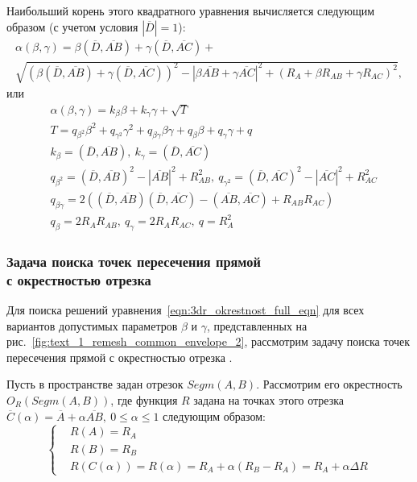 Наибольший корень этого квадратного уравнения вычисляется следующим образом (с учетом условия $|\overline{D}| = 1$):
\begin{multline}
	\alpha(\beta, \gamma) = \beta (\overline{D}, \overline{AB}) + \gamma (\overline{D}, \overline{AC}) + \\
	\sqrt{(\beta (\overline{D}, \overline{AB}) + \gamma (\overline{D}, \overline{AC}))^2 - |\beta \overline{AB} + \gamma \overline{AC}|^2 + (R_A + \beta R_{AB} + \gamma R_{AC})^2},
\end{multline}
или
\begin{equation}\label{eqn:3dr_okrestnost_full_eqn}
	\begin{aligned}
		& \alpha(\beta, \gamma) = k_{\beta} \beta + k_{\gamma} \gamma + \sqrt{T} \\
		& T = q_{\beta^2} \beta^2 + q_{\gamma^2} \gamma^2 + q_{\beta \gamma} \beta \gamma + q_{\beta} \beta + q_{\gamma} \gamma + q \\
		& k_{\beta} = (\overline{D}, \overline{AB}), \ k_{\gamma} = (\overline{D}, \overline{AC}) \\
		& q_{\beta^2} = (\overline{D}, \overline{AB})^2 - |\overline{AB}|^2 + R_{AB}^2, \ q_{\gamma^2} = (\overline{D}, \overline{AC})^2 - |\overline{AC}|^2 + R_{AC}^2 \\
		& q_{\beta \gamma} = 2 \left( (\overline{D}, \overline{AB}) (\overline{D}, \overline{AC}) - (\overline{AB}, \overline{AC}) + R_{AB}R_{AC} \right) \\
		& q_{\beta} = 2 R_A R_{AB}, \ q_{\gamma} = 2 R_A R_{AC}, \ q = R_A^2
	\end{aligned}
\end{equation}

\subsubsection{Задача поиска точек пересечения прямой \\ с окрестностью отрезка}\label{sec:text_1_geo_prim_line_eps_intersect}

Для поиска решений уравнения~\eqref{eqn:3dr_okrestnost_full_eqn} для всех вариантов допустимых параметров $\beta$ и $\gamma$, представленных на рис.~\ref{fig:text_1_remesh_common_envelope_2}, рассмотрим задачу поиска точек пересечения прямой с окрестностью отрезка \cite{Rybakov2017Flight}.

Пусть в пространстве задан отрезок $Segm(A, B)$.
Рассмотрим его окрестность $O_R(Segm(A, B))$, где функция $R$ задана на точках этого отрезка $\overline{C}(\alpha) = \overline{A} + \alpha \overline{AB}, \ 0 \le \alpha \le 1$ следующим образом:
\begin{equation}
	\left\{
		\begin{aligned}
			& R(A) = R_A \\
			& R(B) = R_B \\
			& R(C(\alpha)) = R(\alpha) = R_A + \alpha (R_B - R_A) = R_A + \alpha \Delta R
		\end{aligned}
	\right.
\end{equation}

